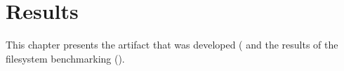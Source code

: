 
\chapter{Results}
\label{ch:results}

This chapter presents the artifact that was developed ( and the results of the filesystem benchmarking ().


